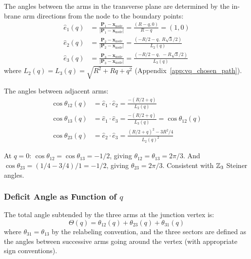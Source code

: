 The angles between the arms in the transverse plane are determined by
the in-brane arm directions from the node to the boundary points:
\begin{align}
    \hat{e}_1(q) &= \frac{\mathbf{P}_1 - \mathbf{x}_{\mathrm{node}}}{|\mathbf{P}_1 - \mathbf{x}_{\mathrm{node}}|}
        = \frac{(R - q, 0)}{R - q} = (1, 0) \label{eq:dir1}\\
    \hat{e}_2(q) &= \frac{\mathbf{P}_2 - \mathbf{x}_{\mathrm{node}}}{|\mathbf{P}_2 - \mathbf{x}_{\mathrm{node}}|}
        = \frac{(-R/2 - q,\; R\sqrt{3}/2)}{L_2(q)} \label{eq:dir2}\\
    \hat{e}_3(q) &= \frac{\mathbf{P}_3 - \mathbf{x}_{\mathrm{node}}}{|\mathbf{P}_3 - \mathbf{x}_{\mathrm{node}}|}
        = \frac{(-R/2 - q,\; -R\sqrt{3}/2)}{L_3(q)} \label{eq:dir3}
\end{align}
where $L_2(q) = L_3(q) = \sqrt{R^2 + Rq + q^2}$
(Appendix~\ref{app:vq_chosen_path}).

The angles between adjacent arms:
\begin{align}
    \cos\theta_{12}(q) &= \hat{e}_1 \cdot \hat{e}_2
        = \frac{-(R/2 + q)}{L_2(q)} \label{eq:cos12}\\
    \cos\theta_{13}(q) &= \hat{e}_1 \cdot \hat{e}_3
        = \frac{-(R/2 + q)}{L_3(q)} = \cos\theta_{12}(q)
        \label{eq:cos13}\\
    \cos\theta_{23}(q) &= \hat{e}_2 \cdot \hat{e}_3
        = \frac{(R/2 + q)^2 - 3R^2/4}{L_2(q)^2}
        \label{eq:cos23}
\end{align}

At $q = 0$: $\cos\theta_{12} = \cos\theta_{13} = -1/2$, giving
$\theta_{12} = \theta_{13} = 2\pi/3$. And
$\cos\theta_{23} = (1/4 - 3/4)/1 = -1/2$, giving
$\theta_{23} = 2\pi/3$. Consistent with $\mathbb{Z}_3$ Steiner angles.

\subsubsection{Deficit Angle as Function of $q$}

The total angle subtended by the three arms at the junction vertex is:
\begin{equation}
    \Theta(q) = \theta_{12}(q) + \theta_{23}(q) + \theta_{31}(q)
    \label{eq:total_angle}
\end{equation}
where $\theta_{31} = \theta_{13}$ by the relabeling convention,
and the three sectors are defined as the angles between successive
arms going around the vertex (with appropriate sign conventions).

